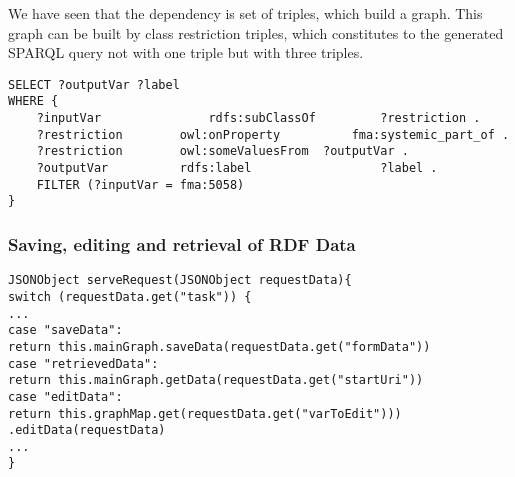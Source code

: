 We have seen that the dependency is set of triples, which build a graph. This graph can be built by class restriction triples, which constitutes to the generated SPARQL query not with one triple but with three triples.


\begin{lstlisting}[basicstyle=\footnotesize, frame=single, caption={SPARQL query generated by class restriction triple}, label=JS_subFormRoutine, captionpos=b, belowskip=1em, aboveskip=2em]
SELECT ?outputVar ?label 
WHERE {
	?inputVar				rdfs:subClassOf			?restriction .
	?restriction		owl:onProperty			fma:systemic_part_of .
	?restriction		owl:someValuesFrom	?outputVar .
	?outputVar			rdfs:label					?label .	
	FILTER (?inputVar = fma:5058)
}
\end{lstlisting}


\subsubsection{Saving, editing and retrieval of RDF Data}





\begin{lstlisting}[basicstyle=\footnotesize, frame=single, caption={Loading form data from FormConfiguration}, label=serveRequest, captionpos=b, belowskip=1em, aboveskip=2em]
JSONObject serveRequest(JSONObject requestData){
switch (requestData.get("task")) {
...
case "saveData": 
return this.mainGraph.saveData(requestData.get("formData"))
case "retrievedData": 
return this.mainGraph.getData(requestData.get("startUri"))
case "editData": 
return this.graphMap.get(requestData.get("varToEdit")))
.editData(requestData)
...		
}
\end{lstlisting}
